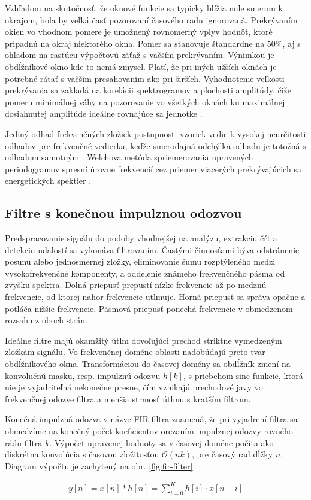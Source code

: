 Vzhľadom na skutočnosť, že oknové funkcie sa typicky blížia nule smerom k okrajom, bola by veľká časť pozorovaní
časového radu ignorovaná. Prekrývaním okien vo vhodnom pomere je umožnený rovnomerný vplyv
hodnôt, ktoré pripadnú na okraj niektorého okna. Pomer sa stanovuje štandardne
na 50\%, aj s ohľadom na rastúcu výpočtovú záťaž s väčším prekrývaním. Výnimkou je obdĺžníkové okno kde to nemá
zmysel. Platí, že pri iných užších oknách je potrebné rátať s väčším presahovaním ako pri širších. Vyhodnotenie veľkosti
prekrývania sa zakladá na korelácii spektrogramov a plochosti amplitúdy, čiže pomeru minimálnej váhy na pozorovanie
vo všetkých oknách ku maximálnej dosiahnutej amplitúde ideálne rovnajúce sa jednotke \cite{spectral-density-estimation}.

Jediný odhad frekvenčných zložiek postupnosti vzoriek vedie k vysokej neurčitosti odhadov pre frekvenčné vedierka,
keďže smerodajná odchýlka odhadu je totožná s odhadom samotným \cite{spectral-density-estimation}. Welchova metóda
spriemerovania upravených periodogramov spresní úrovne frekvencií cez priemer viacerých prekrývajúcich
sa energetických spektier \cite{welch-method}.

\subsection{Filtre s konečnou impulznou odozvou}
Predspracovanie signálu do podoby vhodnejšej na analýzu, extrakciu čŕt a detekciu udalostí sa vykonáva filtrovaním.
Častými činnosťami býva odstránenie posunu alebo jednosmernej zložky, eliminovanie šumu rozptýleného medzi
vysokofrekvenčné komponenty, a oddelenie známeho frekvenčného pásma od zvyšku spektra. Dolná priepusť prepustí
nízke frekvencie až po medznú frekvencie, od ktorej nahor frekvencie utlmuje. Horná priepusť sa správa opačne
a potláča nižšie frekvencie. Pásmová priepusť ponechá frekvencie v obmedzenom rozsahu z oboch strán.

Ideálne filtre majú okamžitý útlm dovoľujúci prechod striktne vymedzeným zložkám signálu. Vo frekvenčnej doméne
oblasti nadobúdajú preto tvar obdĺžníkového okna. Transformáciou do časovej domény sa obdĺžník zmení
na konvolučnú masku, resp. impulznú odozvu $h[k]$, s priebehom $\mathrm{sinc}$ funkcie, ktorá nie je vyjadriteľná nekonečne
presne, čím vznikajú prechodové javy vo frekvenčnej odozve filtra a menšia strmosť útlmu s kratším filtrom.

Konečná impulzná odozva v názve FIR filtra znamená, že pri vyjadrení filtra sa obmedzíme na konečný počet
koeficientov orezaním impulznej odozvy rovného rádu filtra $k$. Výpočet upravenej hodnoty sa v časovej doméne počíta
ako diskrétna konvolúcia s časovou zložitosťou $\mathcal{O}(nk)$, pre časový rad dĺžky $n$. Diagram výpočtu je zachytený
na obr. \ref{fig:fir-filter}.
\begin{ceqn}\begin{align}
y[n] = x[n] * h[n] = \sum_{i=0}^{K}{h[i] \cdot x[n - i]}
\end{align}\end{ceqn}

